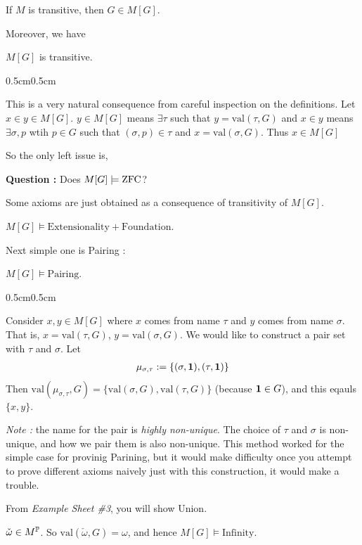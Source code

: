 \documentclass[12pt,a4paper]{article}
\newenvironment{proof}
{\begin{changemargin}{0.5cm}{0.5cm} 
	}%
	{\end{changemargin}
}
\newenvironment{p}
{\begin{proof} 
	}%
	{\end{proof}
}
\begin{document}
\corr If $M$ is transitive, then $G\in M[G]$.
\s

Moreover, we have
\s

\lem $M[G]$ is transitive.
\begin{p}
\pf This is a very natural consequence from careful inspection on the definitions. Let $x\in y\in M[G]$. $y\in M[G]$ means $\exists \tau$ such that $y= \text{val}(\tau, G)$ and $x\in y$ means $\exists \sigma, p$ wtih $p\in G$ such that $(\sigma, p)\in \tau$ and $x= \text{val}(\sigma, G)$. Thus $x\in M[G]$

\eop 
\end{p}
\s

So the only left issue is, 

\textbf{Question :} Does $M[G] \models \text{ZFC}$?
\s

Some axioms are just obtained as a consequence of transitivity of $M[G]$.
\s

\corr $M[G] \models \text{Extensionality} + \text{Foundation}$.
\s

Next simple one is Pairing : 
\s

\prop $M[G] \models \text{Pairing}$.
\begin{p}
\pf Consider $x, y\in M[G]$ where $x$ comes from name $\tau$ and $y$ comes from name $\sigma$. That is, $x= \text{val}(\tau, G)$, $y = \text{val}(\sigma, G)$. We would like to construct a pair set with $\tau$ and $\sigma$. Let
\begin{align*}
\mu_{\sigma, \tau} := \{(\sigma, \bm{1}), (\tau, \bm{1})\}
\end{align*}
Then $\text{val}(\mu_{\sigma, \tau}, G) = \{\text{val}(\sigma, G), \text{val}(\tau, G)\}$ (because $\bm{1} \in G$), and this eqauls $\{x,y\}$.

\eop
\end{p}

\s

\emph{Note :} the name for the pair is \emph{highly non-unique}. The choice of $\tau$ and $\sigma$ is non-unique, and how we pair them is also non-unique. This method worked for the simple case for provinig Parining, but it would make difficulty once you attempt to prove different axioms naively just with this construction, it would make a trouble. 
\s

From \emph{Example Sheet \#3}, you will show Union.
\s

\corr $\check{\omega} \in M^{\mathbb{P}}$. So $\text{val}(\check{\omega}, G) =\omega$, and hence $M[G] \models \text{Infinity}$.
\s
\end{document}
